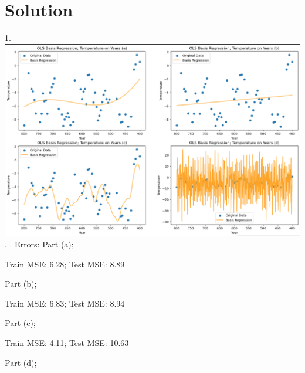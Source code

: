 \documentclass[submit]{harvardml}
\newenvironment{solution}
  {\color{blue}\section*{Solution}}
{}
\begin{document}
\begin{solution}
1.  \includegraphics[width=0.5\linewidth]{hw1/ss3.png}.
. Errors: Part (a);

 Train MSE: 6.28; Test MSE: 8.89


Part (b);

 Train MSE: 6.83; Test MSE: 8.94


Part (c);

 Train MSE: 4.11; Test MSE: 10.63


Part (d);


\end{solution}
\end{document}
